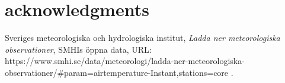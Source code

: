 \documentclass[aps,prl,groupedaddress,twocolumn]{revtex4-1}
\begin{document}
\section{acknowledgments}


\begin{thebibliography}{99}

Sveriges meteorologiska och hydrologiska institut, \textit{Ladda ner meteorologiska observationer}, SMHIs öppna data, URL: https://www.smhi.se/data/meteorologi/ladda-ner-meteorologiska-observationer/\#param=airtemperature-Instant,stations=core .
\end{thebibliography}
\end{document}
